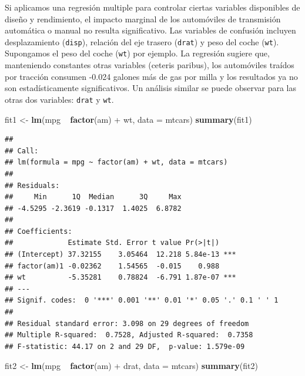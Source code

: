 \documentclass[]{article}
\newenvironment{Shaded}{\begin{snugshade}}{\end{snugshade}}
\newcommand{\KeywordTok}[1]{\textcolor[rgb]{0.13,0.29,0.53}{\textbf{{#1}}}}
\newcommand{\DataTypeTok}[1]{\textcolor[rgb]{0.13,0.29,0.53}{{#1}}}
\newcommand{\StringTok}[1]{\textcolor[rgb]{0.31,0.60,0.02}{{#1}}}
\newcommand{\NormalTok}[1]{{#1}}
\numberwithin{equation}{section}
\begin{document}
Si aplicamos una regresión multiple para controlar ciertas variables
disponibles de diseño y rendimiento, el impacto marginal de los
automóviles de transmisión automática o manual no resulta significativo.
Las variables de confusión incluyen desplazamiento (\texttt{disp}),
relación del eje trasero (\texttt{drat}) y peso del coche (\texttt{wt}).
Supongamos el peso del coche (\texttt{wt}) por ejemplo. La regresión
sugiere que, manteniendo constantes otras variables (ceteris paribus),
los automóviles traídos por tracción consumen -0.024 galones más de gas
por milla y los resultados ya no son estadísticamente significativos. Un
análisis similar se puede observar para las otras dos variables:
\texttt{drat} y \texttt{wt}.

\begin{Shaded}
\begin{Highlighting}[]
\NormalTok{fit1 <-}\StringTok{ }\KeywordTok{lm}\NormalTok{(mpg ~}\StringTok{ }\KeywordTok{factor}\NormalTok{(am) +}\StringTok{ }\NormalTok{wt, }\DataTypeTok{data =} \NormalTok{mtcars)}
\KeywordTok{summary}\NormalTok{(fit1)}
\end{Highlighting}
\end{Shaded}

\begin{verbatim}
## 
## Call:
## lm(formula = mpg ~ factor(am) + wt, data = mtcars)
## 
## Residuals:
##     Min      1Q  Median      3Q     Max 
## -4.5295 -2.3619 -0.1317  1.4025  6.8782 
## 
## Coefficients:
##             Estimate Std. Error t value Pr(>|t|)    
## (Intercept) 37.32155    3.05464  12.218 5.84e-13 ***
## factor(am)1 -0.02362    1.54565  -0.015    0.988    
## wt          -5.35281    0.78824  -6.791 1.87e-07 ***
## ---
## Signif. codes:  0 '***' 0.001 '**' 0.01 '*' 0.05 '.' 0.1 ' ' 1
## 
## Residual standard error: 3.098 on 29 degrees of freedom
## Multiple R-squared:  0.7528, Adjusted R-squared:  0.7358 
## F-statistic: 44.17 on 2 and 29 DF,  p-value: 1.579e-09
\end{verbatim}

\begin{Shaded}
\begin{Highlighting}[]
\NormalTok{fit2 <-}\StringTok{ }\KeywordTok{lm}\NormalTok{(mpg ~}\StringTok{ }\KeywordTok{factor}\NormalTok{(am) +}\StringTok{ }\NormalTok{drat, }\DataTypeTok{data =} \NormalTok{mtcars)}
\KeywordTok{summary}\NormalTok{(fit2)}
\end{Highlighting}
\end{Shaded}
\end{document}
